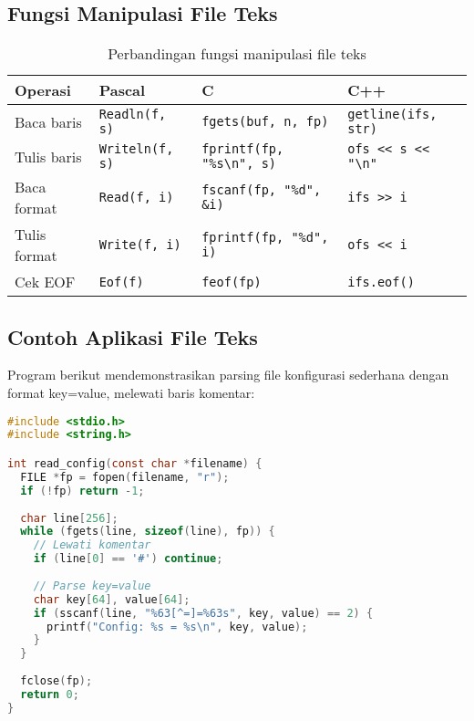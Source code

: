 \documentclass[../main.tex]{subfiles}
\begin{document}
\subsection{Fungsi Manipulasi File Teks}

\begin{table}[H]
\centering
\begin{tabular}{|l|l|l|l|}
\hline
\textbf{Operasi} & \textbf{Pascal} & \textbf{C} & \textbf{C++} \\ \hline
Baca baris & \texttt{Readln(f, s)} & \texttt{fgets(buf, n, fp)} & \texttt{getline(ifs, str)} \\ \hline
Tulis baris & \texttt{Writeln(f, s)} & \texttt{fprintf(fp, "\%s\textbackslash n", s)} & \texttt{ofs << s << "\textbackslash n"} \\ \hline
Baca format & \texttt{Read(f, i)} & \texttt{fscanf(fp, "\%d", \&i)} & \texttt{ifs >> i} \\ \hline
Tulis format & \texttt{Write(f, i)} & \texttt{fprintf(fp, "\%d", i)} & \texttt{ofs << i} \\ \hline
Cek EOF & \texttt{Eof(f)} & \texttt{feof(fp)} & \texttt{ifs.eof()} \\ \hline
\end{tabular}
\caption{Perbandingan fungsi manipulasi file teks}
\end{table}

\subsection{Contoh Aplikasi File Teks}

Program berikut mendemonstrasikan parsing file konfigurasi sederhana dengan format key=value, melewati baris komentar:

\begin{lstlisting}[language=C, caption={Membaca file konfigurasi sederhana}]
#include <stdio.h>
#include <string.h>

int read_config(const char *filename) {
  FILE *fp = fopen(filename, "r");
  if (!fp) return -1;
  
  char line[256];
  while (fgets(line, sizeof(line), fp)) {
    // Lewati komentar
    if (line[0] == '#') continue;
    
    // Parse key=value
    char key[64], value[64];
    if (sscanf(line, "%63[^=]=%63s", key, value) == 2) {
      printf("Config: %s = %s\n", key, value);
    }
  }
  
  fclose(fp);
  return 0;
}
\end{lstlisting}
\end{document}

